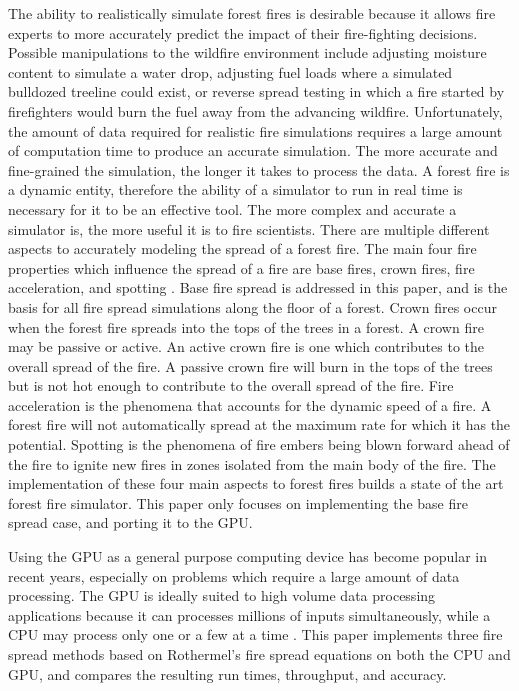 The ability to realistically simulate forest fires is desirable because it allows fire experts to more accurately predict the impact of their fire-fighting decisions. Possible manipulations to the wildfire environment include adjusting moisture content to simulate a water drop, adjusting fuel loads where a simulated bulldozed treeline could exist, or reverse spread testing in which a fire started by firefighters would burn the fuel away from the advancing wildfire. Unfortunately, the amount of data required for realistic fire simulations requires a large amount of computation time to produce an accurate simulation. The more accurate and fine-grained the simulation, the longer it takes to process the data. A forest fire is a dynamic entity, therefore the ability of a simulator to run in real time is necessary for it to be an effective tool. The more complex and accurate a simulator is, the more useful it is to fire scientists. There are multiple different aspects to accurately modeling the spread of a forest fire. The main four fire properties which influence the spread of a fire are base fires, crown fires, fire acceleration, and spotting \cite{fireReview}. Base fire spread is addressed in this paper, and is the basis for all fire spread simulations along the floor of a forest. Crown fires occur when the forest fire spreads into the tops of the trees in a forest. A crown fire may be passive or active. An active crown fire is one which contributes to the overall spread of the fire. A passive crown fire will burn in the tops of the trees but is not hot enough to contribute to the overall spread of the fire. Fire acceleration is the phenomena that accounts for the dynamic speed of a fire. A forest fire will not automatically spread at the maximum rate for which it has the potential. Spotting is the phenomena of fire embers being blown forward ahead of the fire to ignite new fires in zones isolated from the main body of the fire. The implementation of these four main aspects to forest fires builds a state of the art forest fire simulator. This paper only focuses on implementing the base fire spread case, and porting it to the GPU. 

Using the GPU as a general purpose computing device has become popular in recent years, especially on problems which require a large amount of data processing. The GPU is ideally suited to high volume data processing applications because it can processes millions of inputs simultaneously, while a CPU may process only one or a few at a time \cite{cudabyexample}. This paper implements three fire spread methods based on Rothermel's fire spread equations on both the CPU and GPU, and compares the resulting run times, throughput, and accuracy. 